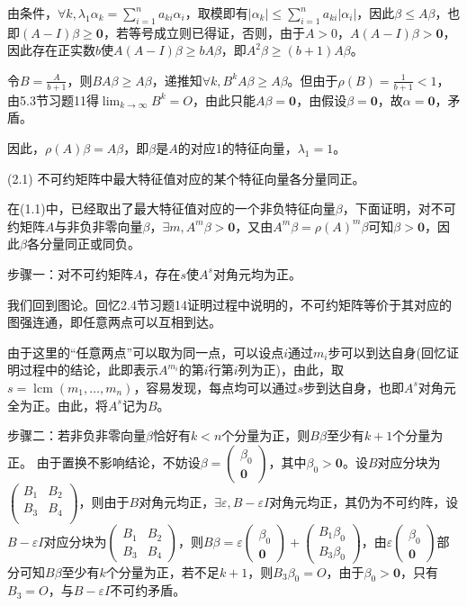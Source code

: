 \documentclass[a4paper,UTF8,fontset=windows]{ctexart}
\DeclareMathOperator{\lcm}{lcm}
\begin{document}
\begin{enumerate}
由条件，$\forall k,\lambda_1\alpha_k=\sum_{i=1}^{n}a_{ki}\alpha_i$，取模即有$|\alpha_k|\le\sum_{i=1}^{n}a_{ki}|\alpha_i|$，因此$\beta\le A\beta$，也即$(A-I)\beta\ge\mathbf{0}$，若等号成立则已得证，否则，由于$A>0$，$A(A-I)\beta>\mathbf{0}$，因此存在正实数$b$使$A(A-I)\beta\ge bA\beta$，即$A^2\beta\ge(b+1)A\beta$。

令$B=\frac{A}{b+1}$，则$BA\beta\ge A\beta$，递推知$\forall k,B^kA\beta\ge A\beta$。但由于$\rho(B)=\frac{1}{b+1}<1$，由5.3节习题11得$\lim_{k\to\infty}{B^k}=O$，由此只能$A\beta=\mathbf{0}$，由假设$\beta=\mathbf{0}$，故$\alpha=\mathbf{0}$，矛盾。

因此，$\rho(A)\beta=A\beta$，即$\beta$是$A$的对应1的特征向量，$\lambda_1=1$。

(2.1) 不可约矩阵中最大特征值对应的某个特征向量各分量同正。

在(1.1)中，已经取出了最大特征值对应的一个非负特征向量$\beta$，下面证明，对不可约矩阵$A$与非负非零向量$\beta$，$\exists m,A^m\beta>\mathbf{0}$，又由$A^m\beta=\rho(A)^m\beta$可知$\beta>\mathbf{0}$，因此$\beta$各分量同正或同负。

步骤一：对不可约矩阵$A$，存在$s$使$A^s$对角元均为正。

我们回到图论。回忆2.4节习题14证明过程中说明的，不可约矩阵等价于其对应的图强连通，即任意两点可以互相到达。

由于这里的“任意两点”可以取为同一点，可以设点$i$通过$m_i$步可以到达自身(回忆证明过程中的结论，此即表示$A^{m_i}$的第$i$行第$i$列为正)，由此，取$s=\lcm(m_1,\dots,m_n)$，容易发现，每点均可以通过$s$步到达自身，也即$A^s$对角元全为正。由此，将$A^s$记为$B$。

步骤二：若非负非零向量$\beta$恰好有$k<n$个分量为正，则$B\beta$至少有$k+1$个分量为正。
由于置换不影响结论，不妨设$\beta=\begin{pmatrix}\beta_0\\\mathbf{0}\end{pmatrix}$，其中$\beta_0>\mathbf{0}$。设$B$对应分块为$\begin{pmatrix}B_1&B_2\\B_3&B_4\\\end{pmatrix}$，则由于$B$对角元均正，$\exists\varepsilon,B-\varepsilon I$对角元均正，其仍为不可约阵，设$B-\varepsilon I$对应分块为$\begin{pmatrix}B_1&B_2\\B_3&B_4\end{pmatrix}$，则$B\beta=\varepsilon\begin{pmatrix}\beta_0\\\mathbf{0}\end{pmatrix}+\begin{pmatrix}B_1\beta_0\\B_3\beta_0\end{pmatrix}$，由$\varepsilon\begin{pmatrix}\beta_0\\\mathbf{0}\end{pmatrix}$部分可知$B\beta$至少有$k$个分量为正，若不足$k+1$，则$B_3\beta_0=O$，由于$\beta_0>\mathbf{0}$，只有$B_3=O$，与$B-\varepsilon I$不可约矛盾。


\end{enumerate}
\end{document}
